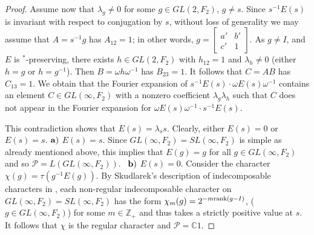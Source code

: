 \documentclass[11pt]{amsart}
\theoremstyle{plain}
\theoremstyle{definition}
\theoremstyle{remark}
\numberwithin{equation}{section}
\begin{document}
\begin{proof}
Assume now that $\lambda_g\neq 0$ for some $g \in GL(2,F_2)$, $g\neq s$.  Since $s^{-1}E(s)$ is invariant with respect to conjugation by $s$, without loss of generality we may assume that $A=s^{-1}g$ has $A_{12}=1$; in other words, $g = \begin{bmatrix} a' & b' \\ c' &1 \end{bmatrix}$. As $g\neq I$, and $E$ is $^*$-preserving, there exists $h\in GL(2,F_2)$ with $h_{12}=1$ and $\lambda_h\neq 0$ (either $h=g$ or $h=g^{-1}$). Then $B=\omega h\omega^{-1}$ has $B_{23}=1$. It follows 
that $C=AB$ has $C_{13}=1$. We obtain that the Fourier expansion of $s^{-1}E(s)\cdot \omega E(s)\omega^{-1}$ contains an element $C\in GL(\infty,F_2)$ with a nonzero coefficient $\lambda_g\lambda_h$ such that $C$ does not appear in the Fourier expansion for $\omega E(s)\omega^{-1}\cdot s^{-1}E(s)$. 
		
		
This contradiction shows that $E(s)=\lambda_s s$. Clearly, either $E(s)=0$ or $E(s)=s$.
		\vskip 0.1cm
\noindent ${\bf a)}$ $E(s)=s$. Since $GL(\infty,F_2)=SL(\infty,F_2)$ is simple as already mentioned above,
this implies that $E(g)=g$ for all $g\in GL(\infty,F_2)$ and so $\mathcal P=L(GL(\infty,F_2))$.\
		\vskip 0.1cm
\noindent ${\bf b)}$ $E(s)=0$. Consider the character $\chi(g)=\tau(g^{-1}E(g))$.  By Skudlarek's description of indecomposable characters in \cite{Skudlarek}, each non-regular indecomposable character on $GL(\infty,F_2)=SL(\infty,F_2)$ has the form $\chi_m(g)=2^{-m{\rm rank}(g-I)}$, ($ g \in GL(\infty,F_2)$) for some $m\in\mathbb Z_+$ and thus takes a strictly  positive value at $s$. It follows that $\chi$ is the regular character and $\mathcal P=\mathbb C 1$. 	
\end{proof}
\end{document}
